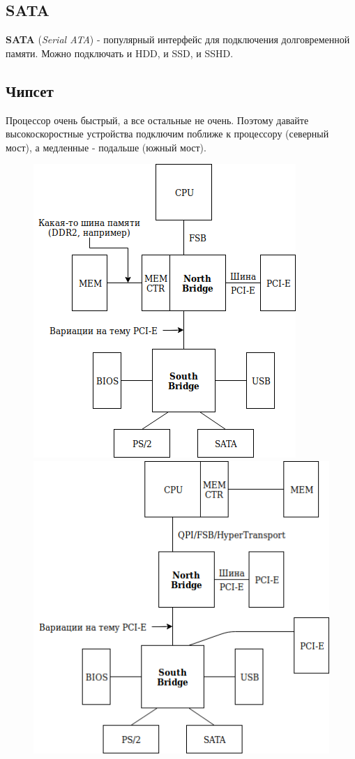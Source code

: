 \documentclass[12pt, a4paper]{article}
\begin{document}
\subsection{SATA}
\textbf{SATA} (\textit{Serial ATA}) - популярный интерфейс для подключения долговременной памяти. Можно подключать и HDD, и SSD, и SSHD.
\subsection{Чипсет}
Процессор очень быстрый, а все остальные не очень. Поэтому давайте высокоскоростные устройства подключим поближе к процессору (северный мост), а медленные - подальше (южный мост).
\begin{figure}[h]
    \centering
    \includegraphics[scale=0.3]{./images/NBSB.png}
    \includegraphics[scale=0.3]{./images/NBSB1.png}

\end{figure}
\end{document}
